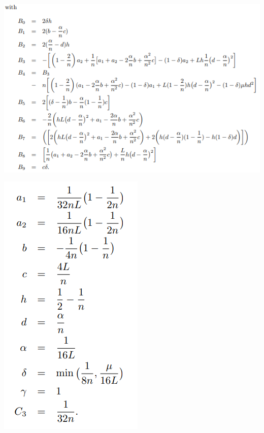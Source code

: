 \documentclass{beamer}
\numberwithin{equation}{aufgabe}
\begin{document}
\begin{frame}
    \includegraphics[width=\textwidth]{images/terms.png}
\end{frame}

\begin{frame}
    \includegraphics[height=\textheight]{images/constants.png}
\end{frame}
\end{document}
